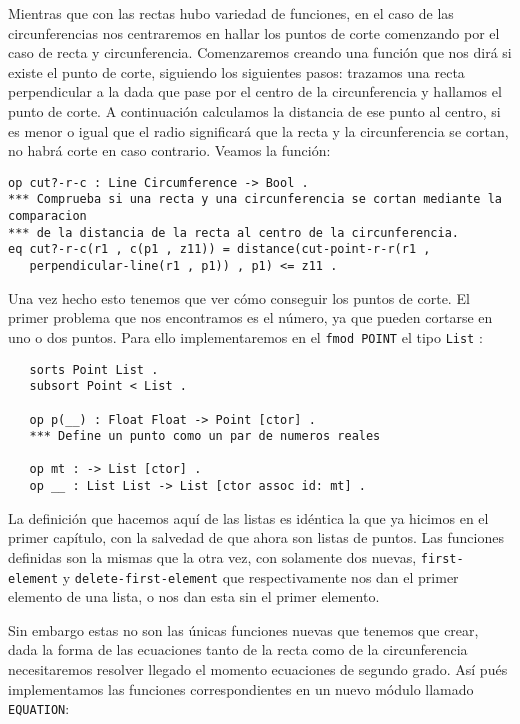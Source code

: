 Mientras que con las rectas hubo variedad de funciones, en el caso de las circunferencias nos centraremos en hallar los puntos de corte comenzando por el caso de recta y circunferencia. Comenzaremos creando una función que nos dirá si existe el punto de corte, siguiendo los siguientes pasos: trazamos una recta perpendicular a la dada que pase por el centro de la circunferencia y hallamos el punto de corte. A continuación calculamos la distancia de ese punto al centro, si es menor o igual que el radio significará que la recta y la circunferencia se cortan, no habrá corte en caso contrario. Veamos la función: \par

{\codesize
\begin{verbatim}
op cut?-r-c : Line Circumference -> Bool .
*** Comprueba si una recta y una circunferencia se cortan mediante la comparacion 
*** de la distancia de la recta al centro de la circunferencia.
eq cut?-r-c(r1 , c(p1 , z11)) = distance(cut-point-r-r(r1 , 
   perpendicular-line(r1 , p1)) , p1) <= z11 .
\end{verbatim}
}

Una vez hecho esto tenemos que ver cómo conseguir los puntos de corte. El primer problema que nos encontramos es el número, ya que pueden cortarse en uno o dos puntos. Para ello implementaremos en el \texttt{fmod POINT} el tipo \texttt{List} :

{\codesize
\begin{verbatim}
   sorts Point List .
   subsort Point < List .

   op p(__) : Float Float -> Point [ctor] .
   *** Define un punto como un par de numeros reales

   op mt : -> List [ctor] .
   op __ : List List -> List [ctor assoc id: mt] . 
\end{verbatim}
}

La definición que hacemos aquí de las listas es idéntica la que ya hicimos en el primer capítulo, con la salvedad de que ahora son listas de puntos. Las funciones definidas son la mismas que la otra vez, con solamente dos nuevas, \texttt{first-element} y \texttt{delete-first-element} que respectivamente nos dan el primer elemento de una lista, o nos dan esta sin el primer elemento.\par

Sin embargo estas no son las únicas funciones nuevas que tenemos que crear, dada la forma de las ecuaciones tanto de la recta como de la circunferencia necesitaremos resolver llegado el momento ecuaciones de segundo grado. Así pués implementamos las funciones correspondientes en un nuevo módulo llamado \texttt{EQUATION}: \par

